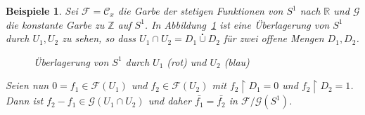 \documentclass[a4paper,oneside]{scrbook}
\theoremstyle{break}
\newtheorem{Bsp}[Def]{Beispiele}
\theoremstyle{nonumberbreak}
\theoremstyle{nonumberplain}
\theoremstyle{break}
\newcommand{\RR}{%
	\ensuremath{\mathbb{R}}%
}
\newcommand{\ZZ}{%
	\ensuremath{\mathbb{Z}}%
}
\begin{document}
\begin{Bsp}
	Sei $\mathcal{F} = \mathcal{C}_x$ die Garbe der stetigen Funktionen von $S^1$ nach $\RR$ und $\mathcal{G}$ die konstante Garbe zu $\ZZ$ auf $S^1$.
	In Abbildung~\ref{fig:quotient_sheave} ist eine Überlagerung von $S^1$ durch $U_1,U_2$ zu sehen, so dass $U_1 \cap U_2 = D_1 \overset{\centerdot}{\cup} D_2$ für zwei offene Mengen $D_1,D_2$.
	\begin{figure}
		\centering
		\caption{Überlagerung von $S^1$ durch $U_1$ (rot) und $U_2$ (blau)}
		\label{fig:quotient_sheave}
        \end{figure}

	Seien nun $0 = f_1 \in \mathcal{F}(U_1)$ und $f_2 \in \mathcal{F}(U_2)$ mit $f_2 \restriction D_1 = 0$ und $f_2 \restriction D_2 = 1$.
	Dann ist $f_2 - f_1 \in \mathcal{G}( U_1 \cap U_2 )$ und daher $\bar{f_1} = \bar{f_2}$ in $\mathcal{F}\big/\mathcal{G}(S^1)$.
\end{Bsp}
\end{document}
